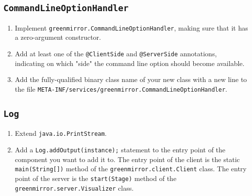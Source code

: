 \subsection{\texttt{CommandLineOptionHandler}}\label{app:ext;sub:cloh}
\begin{enumerate}
  \item Implement \lstinline{greenmirror.CommandLineOptionHandler}, making sure that it has a zero-argument constructor.
  \item Add at least one of the \lstinline{@ClientSide} and \lstinline{@ServerSide} annotations, indicating on which "side" the command line option should become available.
  \item Add the fully-qualified binary class name of your new class with a new line to the file \lstinline{META-INF/services/greenmirror.CommandLineOptionHandler}.
\end{enumerate}
\subsection{\texttt{Log}}\label{app:ext;sub:log}
\begin{enumerate}
  \item Extend \lstinline{java.io.PrintStream}.
  \item Add a \lstinline{Log.addOutput(instance);} statement to the entry point of the component you want to add it to. The entry point of the client is the static \lstinline{main(String[])} method of the \lstinline{greenmirror.client.Client} class. The entry point of the server is the \lstinline{start(Stage)} method of the \lstinline{greenmirror.server.Visualizer} class.
\end{enumerate}